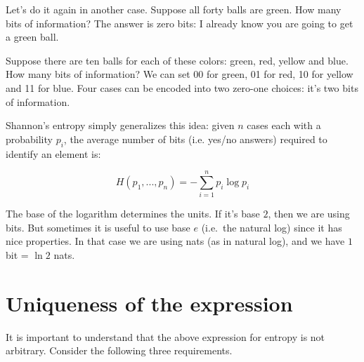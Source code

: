 \documentclass[aps,pra,10pt,floatfix,nofootinbib]{revtex4-1}
\theoremstyle{definition}
\begin{document}
Let's do it again in another case. Suppose all forty balls are green. How many bits of information? The answer is zero bits: I already know you are going to get a green ball.

Suppose there are ten balls for each of these colors: green, red, yellow and blue. How many bits of information? We can set 00 for green, 01 for red, 10 for yellow and 11 for blue. Four cases can be encoded into two zero-one choices: it's two bits of information.

Shannon's entropy simply generalizes this idea: given $n$ cases each with a probability $p_i$, the average number of bits (i.e. yes/no answers) required to identify an element is:

\begin{equation}
\label{ShannonEntropy}
H(p_1, ..., p_n) = - \sum_{i=1}^{n} p_i \log p_i
\end{equation}

The base of the logarithm determines the units. If it's base $2$, then we are using bits. But sometimes it is useful to use base $e$ (i.e.~the natural log) since it has nice properties. In that case we are using nats (as in natural log), and we have $1$ bit = $\ln 2$ nats.

\section{Uniqueness of the expression}

It is important to understand that the above expression for entropy is not arbitrary. Consider the following three requirements.
\end{document}

